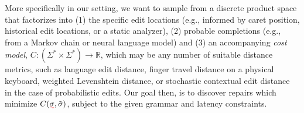 \documentclass[sigplan,review,anonymous,acmsmall]{acmart}\settopmatter{printfolios=false,printccs=false,printacmref=false}
\begin{document}
More specifically in our setting, we want to sample from a discrete product space that factorizes into (1) the specific edit locations (e.g., informed by caret position, historical edit locations, or a static analyzer), (2) probable completions (e.g., from a Markov chain or neural language model) and (3) an accompanying \textit{cost model}, $C: (\Sigma^* \times \Sigma^*) \rightarrow \mathbb{R}$, which may be any number of suitable distance metrics, such as language edit distance, finger travel distance on a physical keyboard, weighted Levenshtein distance, or stochastic contextual edit distance~\cite{cotterell+al.acl14} in the case of probabilistic edits. Our goal then, is to discover repairs which minimize $C(\err{\sigma}, \tilde{\sigma})$, subject to the given grammar and latency constraints.


%
%
\end{document}
